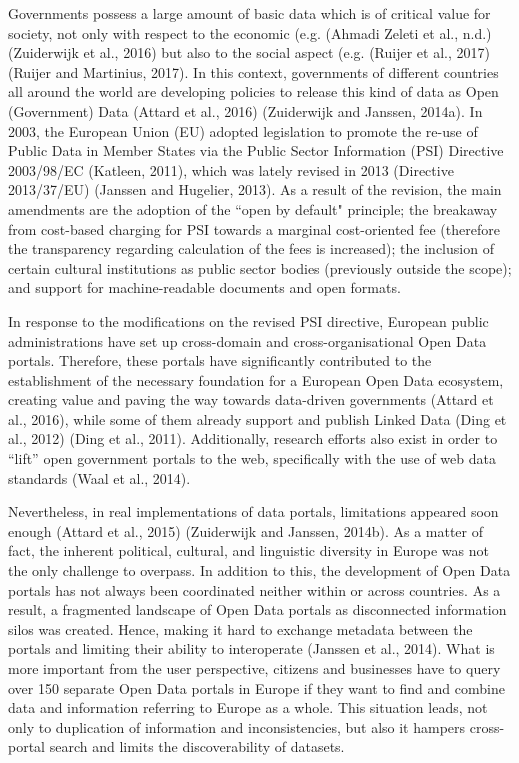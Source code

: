 \documentclass[<options>]{elsarticle}
\begin{document}
Governments possess a large amount of basic data which is of critical value for society, not only with respect to the economic (e.g. (Ahmadi Zeleti et al., n.d.) (Zuiderwijk et al., 2016) but also to the social aspect (e.g. (Ruijer et al., 2017) (Ruijer and Martinius, 2017). In this context, governments of different countries all around the world are developing policies to release this kind of data as Open (Government) Data (Attard et al., 2016) (Zuiderwijk and Janssen, 2014a). In 2003, the European Union (EU) adopted legislation to promote the re-use of Public Data in Member States via the Public Sector Information (PSI) Directive 2003/98/EC (Katleen, 2011), which was lately revised in 2013 (Directive 2013/37/EU) (Janssen and Hugelier, 2013). As a result of the revision, the main amendments are the adoption of the ``open by default" principle; the breakaway from cost-based charging for PSI towards a marginal cost-oriented fee (therefore the transparency regarding calculation of the fees is increased); the inclusion of certain cultural institutions as public sector bodies (previously outside the scope); and support for machine-readable documents and open formats.

In response to the modifications on the revised PSI directive, European public administrations have set up cross-domain and cross-organisational Open Data portals. Therefore, these portals have significantly contributed to the establishment of the necessary foundation for a European Open Data ecosystem, creating value and paving the way towards data-driven governments (Attard et al., 2016), while some of them already support and publish Linked Data (Ding et al., 2012) (Ding et al., 2011). Additionally, research efforts also exist in order to “lift” open government portals to the web, specifically with the use of web data standards (Waal et al., 2014).

Nevertheless, in real implementations of data portals, limitations appeared soon enough (Attard et al., 2015) (Zuiderwijk and Janssen, 2014b). As a matter of fact, the inherent political, cultural, and linguistic diversity in Europe was not the only challenge to overpass. In addition to this, the development of Open Data portals has not always been coordinated neither within or across countries. As a result, a fragmented landscape of Open Data portals as disconnected information silos was created. Hence, making it hard to exchange metadata between the portals and limiting their ability to interoperate (Janssen et al., 2014). What is more important from the user perspective, citizens and businesses have to query over 150 separate Open Data portals in Europe if they want to find and combine data and information referring to Europe as a whole. This situation leads, not only to duplication of information and inconsistencies, but also it hampers cross-portal search and limits the discoverability of datasets.
\end{document}
